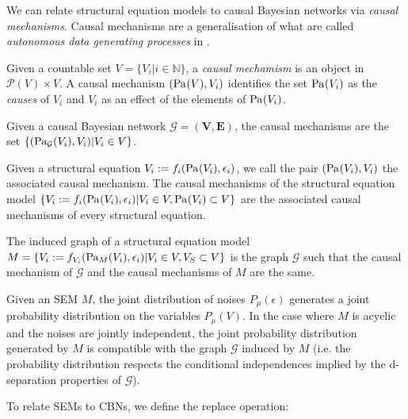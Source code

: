 We can relate structural equation models to causal Bayesian networks via \emph{causal mechanisms}. Causal mechanisms are a generalisation of what are called \emph{autonomous data generating processes} in \cite{bareinboim_local_2012}.

\begin{definition}
Given a countable set $V=\{V_i|i\in \mathbb{N}\}$, a \emph{causal mechamism} is an object in $\mathscr{P}(V)\times V$. A causal mechanism $(\text{Pa}_{}(V),V_i)$ identifies the set $\text{Pa}_{}(V_i)$ as the \emph{causes} of $V_i$ and $V_i$ as an effect of the elements of $\text{Pa}_{}(V_i)$.
\end{definition}

\begin{definition}
Given a causal Bayesian network $\mathcal{G}=(\mathbf{V},\mathbf{E})$, the causal mechanisms are the set $\{(\text{Pa}_{\mathcal{G}}(V_i),V_i)|V_i\in V\}$.
\end{definition}

\begin{definition}
Given a structural equation $V_i := f_{i}(\text{Pa}_{}(V_i),\epsilon_i)$, we call the pair $(\text{Pa}_{}(V_i),V_i)$ the associated causal mechanism. The causal mechanisms of the structural equation model $\{V_i:= f_{i}(\text{Pa}_{}(V_i),\epsilon_i)| V_i\in V, \text{Pa}_{}(V_i)\subset V\}$ are the associated causal mechanisms of every structural equation.
\end{definition}

\begin{definition}
The induced graph of a structural equation model $M=\{V_i:= f_{V_i}(\text{Pa}_{M}(V_i),\epsilon_i)| V_i\in V, V_S\subset V\}$ is the graph $\mathcal{G}$ such that the causal mechanism of $\mathcal{G}$ and the causal mechanisms of $M$ are the same.
\end{definition}

Given an SEM $M$, the joint distribution of noises $P_\mu(\epsilon)$ generates a joint probability distribution on the variables $P_\mu(V)$. In the case where $M$ is acyclic and the noises are jointly independent, the joint probability distribution generated by $M$ is compatible with the graph $\mathcal{G}$ induced by $M$ (i.e. the probability distribution respects the conditional independences implied by the d-separation properties of $\mathcal{G}$)\cite{pearl_causality:_2009}.

To relate SEMs to CBNs, we define the replace operation:

